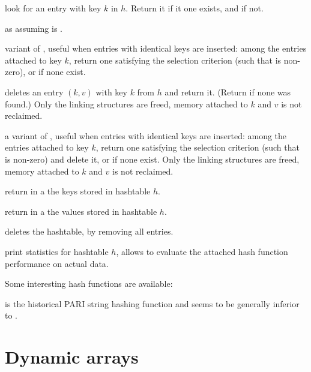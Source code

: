  look for an entry
with key $k$ in $h$. Return it if it one exists, and  if not.

 as
 assuming  is .

 variant of , useful when entries
with identical keys are inserted: among the entries attached to
key $k$, return one satisfying the selection criterion (such that
 is non-zero), or  if none exist.

 deletes an entry $(k,v)$
with key $k$ from $h$ and return it. (Return  if none was found.)
Only the linking structures are freed, memory attached to $k$ and $v$
is not reclaimed.

a variant of , useful when entries with identical keys are
inserted: among the entries attached to key $k$, return one satisfying the
selection criterion (such that  is non-zero) and delete it,
or  if none exist. Only the linking structures are freed, memory
attached to $k$ and $v$ is not reclaimed.

 return in a  the keys
stored in hashtable $h$.

 return in a 
the values stored in hashtable $h$.

 deletes the hashtable, by removing all
entries.

 print statistics for hashtable $h$, allows
to evaluate the attached hash function performance on actual data.

Some interesting hash functions are available:


 is the historical PARI string hashing
function and seems to be generally inferior to .


\section{Dynamic arrays}

